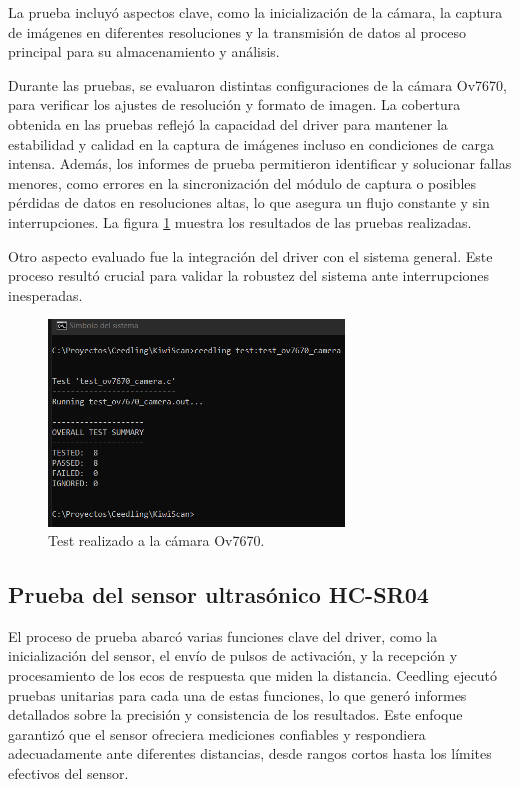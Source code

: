 La prueba incluyó aspectos clave, como la inicialización de la cámara, la captura de imágenes en diferentes resoluciones y la transmisión de datos al proceso principal para su almacenamiento y análisis.

Durante las pruebas, se evaluaron distintas configuraciones de la cámara Ov7670, para verificar los ajustes de resolución y formato de imagen. La cobertura obtenida en las pruebas reflejó la capacidad del driver para mantener la estabilidad y calidad en la captura de imágenes incluso en condiciones de carga intensa. Además, los informes de prueba permitieron identificar y solucionar fallas menores, como errores en la sincronización del módulo de captura o posibles pérdidas de datos en resoluciones altas, lo que asegura un flujo constante y sin interrupciones. La figura \ref{fig:test_ov7670_camera}
muestra los resultados de las pruebas realizadas.

Otro aspecto evaluado fue la integración del driver con el sistema general. Este proceso resultó crucial para validar la robustez del sistema ante interrupciones inesperadas.

\vspace{1cm}

\begin{figure}[htbp]
	\centering
	\includegraphics[width=0.7\textwidth, height=0.3\textheight]{./Figures/test_ov7670_camera.png}
	\caption{Test realizado a la cámara Ov7670.}
	\label{fig:test_ov7670_camera}
\end{figure}

\vspace{1cm}

\subsection{Prueba del sensor ultrasónico HC-SR04}

El proceso de prueba abarcó varias funciones clave del driver, como la inicialización del sensor, el envío de pulsos de activación, y la recepción y procesamiento de los ecos de respuesta que miden la distancia. Ceedling ejecutó pruebas unitarias para cada una de estas funciones, lo que generó informes detallados sobre la precisión y consistencia de los resultados. Este enfoque garantizó que el sensor ofreciera mediciones confiables y respondiera adecuadamente ante diferentes distancias, desde rangos cortos hasta los límites efectivos del sensor.

